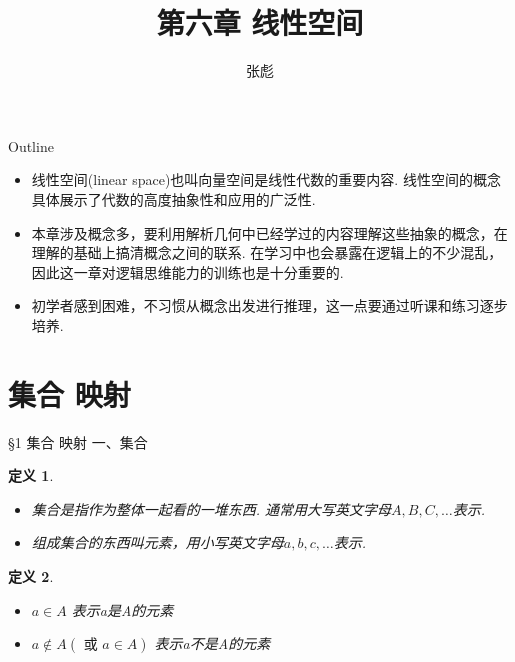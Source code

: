 \documentclass[13pt]{beamer}
\newtheorem*{defi}{定义}
\begin{document}
\title[]{第六章 \quad  线性空间}
\author[]{{\large 张彪}\\  }

\date{}


\AtBeginSection[]
{
\setcounter{exa}{0}
\setcounter{equation}{0}
}


\begin{frame}
\maketitle
\end{frame}

\begin{frame}{Outline}
	\tableofcontents
\end{frame}


\begin{frame}
\begin{itemize}
\item 线性空间(linear space)也叫向量空间是线性代数的重要内容. 线性空间的概念具体展示了代数的高度抽象性和应用的广泛性. 

\item 本章涉及概念多，要利用解析几何中已经学过的内容理解这些抽象的概念，在理解的基础上搞清概念之间的联系. 在学习中也会暴露在逻辑上的不少混乱，因此这一章对逻辑思维能力的训练也是十分重要的. 
	
\item 初学者感到困难，不习惯从概念出发进行推理，这一点要通过听课和练习逐步培养. 
\end{itemize}
\end{frame}


\section{集合 映射}
\begin{frame}{\S 1  集合 映射}
一、集合
\begin{defi}
\begin{itemize}
	\item \alert{集合}是指作为整体一起看的一堆东西. 通常用大写英文字母$A, B, C, \ldots$表示.
	\item 组成集合的东西叫\alert{元素}，用小写英文字母$a, b, c, \ldots$表示.

\end{itemize}
\end{defi}

\begin{defi}
\begin{itemize}
	\item $a \in A$ 表示a是A的元素
	\item $a \notin A(\text { 或 } a \in A)$ 表示a不是A的元素
\end{itemize}
\end{defi}
\end{frame}
\end{document}
